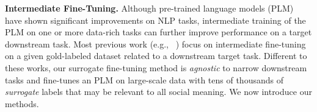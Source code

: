 \textbf{Intermediate Fine-Tuning.} Although pre-trained language models (PLM) have shown significant improvements on NLP tasks, intermediate training of the PLM on one or more data-rich tasks can further improve performance on a target downstream task. Most previous work (e.g., ~\cite{wang-2019-tell,pruksachatkun-2020-intermediate,phang-2020-english,chang-2021-rethinking,poth-2021-pre}) focus on intermediate fine-tuning on a given gold-labeled dataset related to a downstream target task. Different to these works, our surrogate fine-tuning method is \textit{agnostic} to narrow downstream tasks and fine-tunes an PLM on large-scale data with tens of thousands of \textit{surrogate} labels that may be relevant to all social meaning. We now introduce our methods. %



